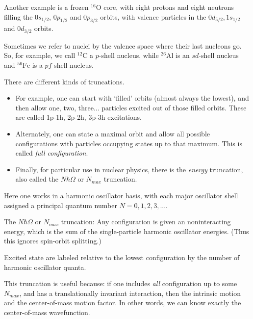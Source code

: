 \documentclass[graybox,sectrefs,envcountresetchap,open=right]{svmonodo}
\begin{document}
Another example is a frozen ${}^{16}\mbox{O}$ core, with eight protons and eight neutrons filling the 
$0s_{1/2}$,  $0p_{1/2}$ and $0p_{3/2}$ orbits, with valence particles in the 
$0d_{5/2}, 1s_{1/2}$ and $0d_{3/2}$ orbits.


Sometimes we refer to nuclei by the valence space where their last nucleons go.  
So, for example, we call ${}^{12}\mbox{C}$ a $p$-shell nucleus, while ${}^{26}\mbox{Al}$ is an 
$sd$-shell nucleus and ${}^{56}\mbox{Fe}$ is a $pf$-shell nucleus.



There are different kinds of truncations.

\begin{itemize}
\item For example, one can start with `filled' orbits (almost always the lowest), and then  allow one, two, three... particles excited out of those filled orbits. These are called  1p-1h, 2p-2h, 3p-3h excitations. 

\item Alternately, one can state a maximal orbit and allow all possible configurations with  particles occupying states up to that maximum. This is called \emph{full configuration}.

\item Finally, for particular use in nuclear physics, there is the \emph{energy} truncation, also  called the $N\hbar\Omega$ or $N_{max}$ truncation. 
\end{itemize}

\noindent
 Here one works in a harmonic oscillator basis, with each major oscillator shell assigned 
a principal quantum number $N=0,1,2,3,...$. 

The $N\hbar\Omega$ or $N_{max}$ truncation: Any configuration is given an noninteracting energy, which is the sum 
of the single-particle harmonic oscillator energies. (Thus this ignores 
spin-orbit splitting.)




Excited state are labeled relative to the lowest configuration by the 
number of harmonic oscillator quanta.

This truncation is useful because: if one includes \emph{all} configuration up to 
some $N_{max}$, and has a translationally invariant interaction, then the intrinsic 
motion and the center-of-mass motion factor. In other words, we can know exactly 
the center-of-mass wavefunction. 
\end{document}
